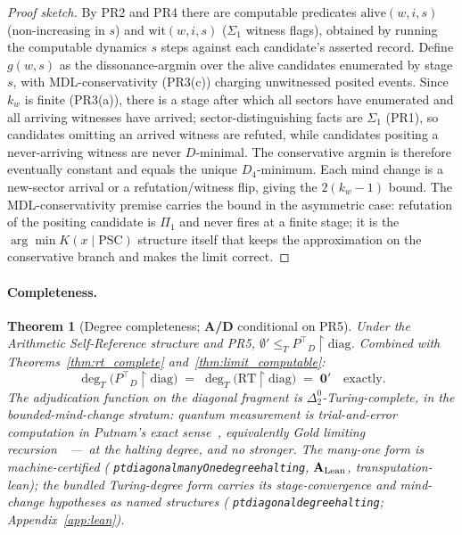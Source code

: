\documentclass[11pt]{article}
\newtheorem{theorem}{Theorem}[section]
\theoremstyle{remark}
\newcommand{\lean}[1]{%
  \penalty-100
  \begingroup\def\_{\textunderscore\allowbreak}\texttt{#1}\endgroup}
\newcommand{\Ptop}{\ensuremath{P^{\top}}}
\newcommand{\CatAL}{\ensuremath{\textbf{A}_{\rm Lean}}}
\newcommand{\CatAD}{\textbf{A/D}}
\begin{document}
\begin{proof}[Proof sketch]
By PR2 and PR4 there are computable predicates $\mathrm{alive}(w,i,s)$
(non-increasing in $s$) and $\mathrm{wit}(w,i,s)$ ($\Sigma_1$ witness
flags), obtained by running the computable dynamics $s$ steps against each
candidate's asserted record. Define $g(w,s)$ as the dissonance-argmin over
the alive candidates enumerated by stage $s$, with MDL-conservativity
(PR3(c)) charging unwitnessed posited events. Since $k_w$ is finite
(PR3(a)), there is a stage after which all sectors have enumerated and all
arriving witnesses have arrived; sector-distinguishing facts are $\Sigma_1$
(PR1), so candidates omitting an arrived witness are refuted, while
candidates positing a never-arriving witness are never $D$-minimal. The
conservative argmin is therefore eventually constant and equals the unique
$D_4$-minimum. Each mind change is a new-sector arrival or a
refutation/witness flip, giving the $2(k_w-1)$ bound.
The MDL-conservativity premise carries the bound in the asymmetric case:
refutation of the positing candidate is $\Pi_1$ and never fires at a finite
stage; it is the $\arg\min K(x \mid \text{PSC})$ structure itself that
keeps the approximation on the conservative branch and makes the limit
correct.
\end{proof}

\paragraph{Completeness.}

\begin{theorem}[Degree completeness; \CatAD{} conditional on PR5]
\label{thm:degree_complete}
Under the Arithmetic Self-Reference structure and PR5,
$\emptyset' \leq_T \Ptop_D{\upharpoonright}\mathrm{diag}$. Combined with
Theorems~\ref{thm:rt_complete} and~\ref{thm:limit_computable}:
\begin{equation}
  \deg_T\!\bigl(\Ptop_D{\upharpoonright}\mathrm{diag}\bigr)
  \;=\;
  \deg_T\!\bigl(\mathrm{RT}{\upharpoonright}\mathrm{diag}\bigr)
  \;=\; \mathbf{0}' \quad \text{exactly.}
\end{equation}
The adjudication function on the diagonal fragment is
$\Delta^0_2$-Turing-complete, in the bounded-mind-change stratum: quantum
measurement is trial-and-error computation in Putnam's exact
sense~\cite{Putnam1965}, equivalently Gold limiting
recursion~\cite{Gold1965}~---~at the halting degree, and no stronger.
The many-one form is machine-certified
(\lean{pt\_diagonal\_manyOne\_degree\_halting}, \CatAL,
transputation-lean); the bundled Turing-degree form carries its
stage-convergence and mind-change hypotheses as named structures
(\lean{pt\_diagonal\_degree\_halting}; Appendix~\ref{app:lean}).
\end{theorem}
\end{document}

